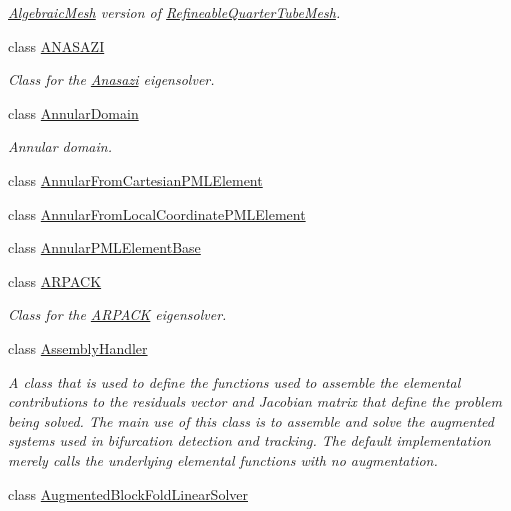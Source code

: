 \begin{DoxyCompactItemize}
\begin{DoxyCompactList}\small\item\em \hyperlink{classoomph_1_1AlgebraicMesh}{Algebraic\+Mesh} version of \hyperlink{classoomph_1_1RefineableQuarterTubeMesh}{Refineable\+Quarter\+Tube\+Mesh}. \end{DoxyCompactList}\item 
class \hyperlink{classoomph_1_1ANASAZI}{A\+N\+A\+S\+A\+ZI}
\begin{DoxyCompactList}\small\item\em Class for the \hyperlink{namespaceAnasazi}{Anasazi} eigensolver. \end{DoxyCompactList}\item 
class \hyperlink{classoomph_1_1AnnularDomain}{Annular\+Domain}
\begin{DoxyCompactList}\small\item\em Annular domain. \end{DoxyCompactList}\item 
class \hyperlink{classoomph_1_1AnnularFromCartesianPMLElement}{Annular\+From\+Cartesian\+P\+M\+L\+Element}
\item 
class \hyperlink{classoomph_1_1AnnularFromLocalCoordinatePMLElement}{Annular\+From\+Local\+Coordinate\+P\+M\+L\+Element}
\item 
class \hyperlink{classoomph_1_1AnnularPMLElementBase}{Annular\+P\+M\+L\+Element\+Base}
\item 
class \hyperlink{classoomph_1_1ARPACK}{A\+R\+P\+A\+CK}
\begin{DoxyCompactList}\small\item\em Class for the \hyperlink{classoomph_1_1ARPACK}{A\+R\+P\+A\+CK} eigensolver. \end{DoxyCompactList}\item 
class \hyperlink{classoomph_1_1AssemblyHandler}{Assembly\+Handler}
\begin{DoxyCompactList}\small\item\em A class that is used to define the functions used to assemble the elemental contributions to the residuals vector and Jacobian matrix that define the problem being solved. The main use of this class is to assemble and solve the augmented systems used in bifurcation detection and tracking. The default implementation merely calls the underlying elemental functions with no augmentation. \end{DoxyCompactList}\item 
class \hyperlink{classoomph_1_1AugmentedBlockFoldLinearSolver}{Augmented\+Block\+Fold\+Linear\+Solver}

\end{DoxyCompactItemize}
